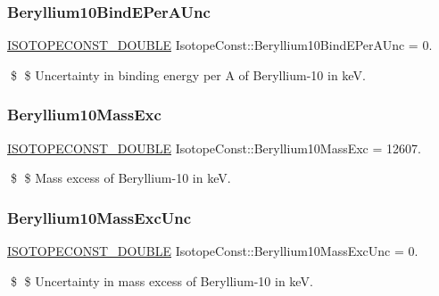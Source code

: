 \subsubsection{\texorpdfstring{Beryllium10\+Bind\+E\+Per\+A\+Unc}{Beryllium10BindEPerAUnc}}
{\footnotesize\ttfamily \mbox{\hyperlink{group___isotope_const-_macros_ga8f45a7272ce02c0b4c65c44636ed719a}{I\+S\+O\+T\+O\+P\+E\+C\+O\+N\+S\+T\+\_\+\+D\+O\+U\+B\+LE}} Isotope\+Const\+::\+Beryllium10\+Bind\+E\+Per\+A\+Unc = 0.}

\$ \$ Uncertainty in binding energy per A of Beryllium-\/10 in keV. \mbox{\label{group___isotope_const-_beryllium-_be10_ga2bb070eac8c9582e79099772cb6eee2e}} 
\subsubsection{\texorpdfstring{Beryllium10\+Mass\+Exc}{Beryllium10MassExc}}
{\footnotesize\ttfamily \mbox{\hyperlink{group___isotope_const-_macros_ga8f45a7272ce02c0b4c65c44636ed719a}{I\+S\+O\+T\+O\+P\+E\+C\+O\+N\+S\+T\+\_\+\+D\+O\+U\+B\+LE}} Isotope\+Const\+::\+Beryllium10\+Mass\+Exc = 12607.}

\$ \$ Mass excess of Beryllium-\/10 in keV. \mbox{\label{group___isotope_const-_beryllium-_be10_ga113c9beb8929ca0a0ac12f8c122efb8b}} 
\subsubsection{\texorpdfstring{Beryllium10\+Mass\+Exc\+Unc}{Beryllium10MassExcUnc}}
{\footnotesize\ttfamily \mbox{\hyperlink{group___isotope_const-_macros_ga8f45a7272ce02c0b4c65c44636ed719a}{I\+S\+O\+T\+O\+P\+E\+C\+O\+N\+S\+T\+\_\+\+D\+O\+U\+B\+LE}} Isotope\+Const\+::\+Beryllium10\+Mass\+Exc\+Unc = 0.}

\$ \$ Uncertainty in mass excess of Beryllium-\/10 in keV. \mbox{\label{group___isotope_const-_beryllium-_be10_gac88cba4edc01c8b78b02c5c75621e21d}} 
